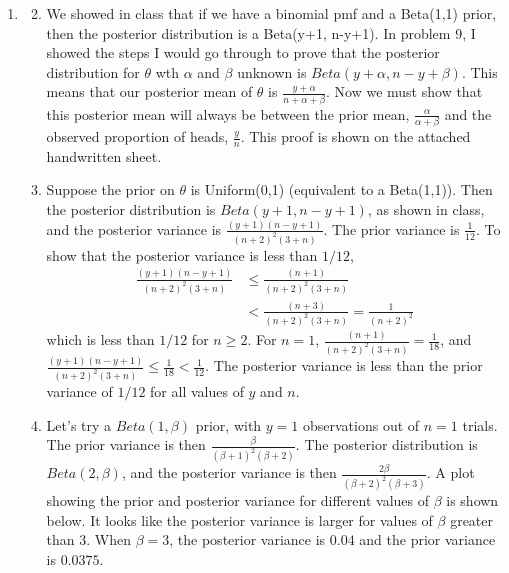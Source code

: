 \documentclass[12pt]{article}\usepackage[]{graphicx}\usepackage[]{color}
\begin{document}
\begin{doublespacing}
\begin{enumerate}
\begin{enumerate}
\end{enumerate}

\item \begin{enumerate} \setcounter{enumii}{1} 
\item We showed in class that if we have a binomial pmf and a Beta(1,1) prior, then the posterior distribution is a Beta(y+1, n-y+1). In problem $9$, I showed the steps I would go through to prove that the posterior distribution for $\theta$ wth $\alpha$ and $\beta$ unknown is $Beta(y+\alpha, n-y+\beta)$. This means that our posterior mean of $\theta$ is $\frac{y+\alpha}{n+\alpha+\beta}$. Now we must show that this posterior mean will always be between the prior mean, $\frac{\alpha}{\alpha+\beta}$ and the observed proportion of heads, $\frac{y}{n}$. This proof is shown on the attached handwritten sheet.

\item Suppose the prior on $\theta$ is Uniform(0,1) (equivalent to a Beta(1,1)). Then the posterior distribution is $Beta(y+1, n-y+1)$, as shown in class, and the posterior variance is $\frac{(y+1)(n-y+1)}{(n+2)^2(3+n)}$. The prior variance is $\frac{1}{12}$. To show that the posterior variance is less than $1/12$,
\begin{align*}
\frac{(y+1)(n-y+1)}{(n+2)^2(3+n)} &\leq \frac{(n+1)}{(n+2)^2(3+n)} \\
&< \frac{(n+3)}{(n+2)^2(3+n)} = \frac{1}{(n+2)^2} 
\end{align*}
which is less than $1/12$ for $n\geq2$. For $n=1$, $\frac{(n+1)}{(n+2)^2(3+n)}=\frac{1}{18}$, and $\frac{(y+1)(n-y+1)}{(n+2)^2(3+n)}\leq\frac{1}{18}<\frac{1}{12}$. The posterior variance is less than the prior variance of $1/12$ for all values of $y$ and $n$. 


\item Let's try a $Beta(1, \beta)$ prior, with $y=1$ observations out of $n=1$ trials. The prior variance is then $\frac{\beta}{(\beta+1)^2(\beta+2)}$. The posterior distribution is $Beta(2, \beta)$, and the posterior variance is then $\frac{2\beta}{(\beta+2)^2(\beta+3)}$. A plot showing the prior and posterior variance for different values of $\beta$ is shown below. It looks like the posterior variance is larger for values of $\beta$ greater than $3$. When $\beta=3$, the posterior variance is $0.04$ and the prior variance is $0.0375$. 


\end{enumerate}
\end{enumerate}
\end{doublespacing}
\end{document}

